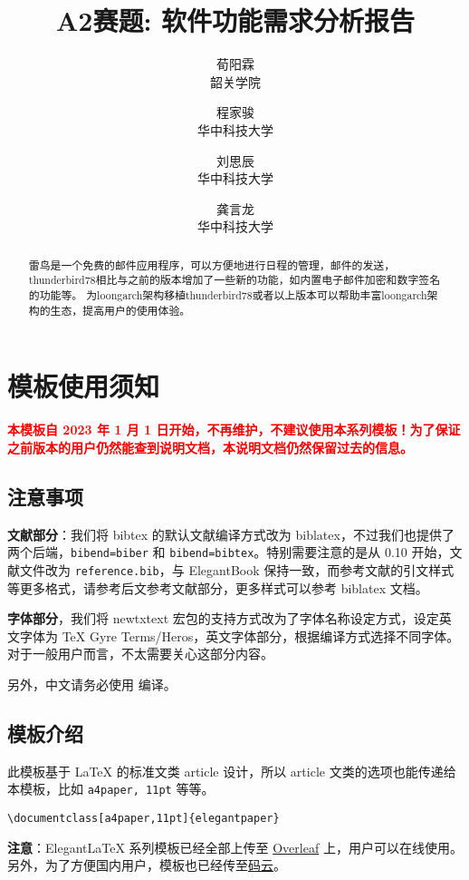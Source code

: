 \documentclass[lang=cn,a4paper,newtx]{elegantpaper}
\title{A2赛题: 软件功能需求分析报告}
\author{荀阳霖	\\ 韶关学院 \and 程家骏 \\ 华中科技大学 \and 刘思辰\\ 华中科技大学 \and 龚言龙 \\ 华中科技大学}
\institute{\href{https://elegantlatex.org/}{porter项目组}}
\date{\zhdate{2023/7/5}}
\begin{document}
\maketitle

\begin{abstract}
    雷鸟是一个免费的邮件应用程序，可以方便地进行日程的管理，邮件的发送，thunderbird78相比与之前的版本增加了一些新的功能，如内置电子邮件加密和数字签名的功能等。
为loongarch架构移植thunderbird78或者以上版本可以帮助丰富loongarch架构的生态，提高用户的使用体验。
\end{abstract}

\section{模板使用须知}

\textcolor{red}{\bfseries 本模板自 2023 年 1 月 1 日开始，不再维护，不建议使用本系列模板！为了保证之前版本的用户仍然能查到说明文档，本说明文档仍然保留过去的信息。}

\subsection{注意事项}
\textbf{文献部分}：我们将 bibtex 的默认文献编译方式改为 biblatex，不过我们也提供了两个后端，\lstinline{bibend=biber} 和 \lstinline{bibend=bibtex}。特别需要注意的是从 0.10 开始，文献文件改为 \lstinline{reference.bib}，与 ElegantBook 保持一致，而参考文献的引文样式等更多格式，请参考后文参考文献部分，更多样式可以参考 biblatex 文档。 

\textbf{字体部分}，我们将 newtxtext 宏包的支持方式改为了字体名称设定方式，设定英文字体为 TeX Gyre Terms/Heros，英文字体部分，根据编译方式选择不同字体。对于一般用户而言，不太需要关心这部分内容。

另外，中文请务必使用  编译。

\subsection{模板介绍}

此模板基于 \LaTeX{} 的标准文类 article 设计，所以 article 文类的选项也能传递给本模板，比如 \lstinline{a4paper, 11pt} 等等。

\begin{lstlisting}
\documentclass[a4paper,11pt]{elegantpaper}
\end{lstlisting}

\textbf{注意}：Elegant\LaTeX{} 系列模板已经全部上传至 \href{https://www.overleaf.com/latex/templates/elegantpaper-template/yzghrqjhmmmr}{Overleaf} 上，用户可以在线使用。另外，为了方便国内用户，模板也已经传至\href{https://gitee.com/ElegantLaTeX/ElegantPaper}{码云}。
\end{document}
